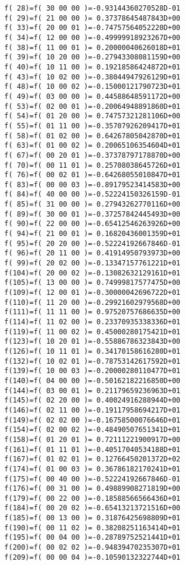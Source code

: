 {\begin{verbatim}
  f( 28)=f( 30 00 00 )=-0.93144360270528D-01
  f( 29)=f( 21 00 00 )= 0.37378645487843D+00
  f( 33)=f( 20 00 01 )=-0.74757564052220D+00
  f( 34)=f( 12 00 00 )=-0.49999918923267D+00
  f( 38)=f( 11 00 01 )= 0.20000040626018D+01
  f( 39)=f( 10 20 00 )=-0.27943308081159D+00
  f( 40)=f( 10 11 00 )= 0.19218586424872D+01
  f( 43)=f( 10 02 00 )=-0.38044947926129D+01
  f( 48)=f( 10 00 02 )=-0.15000121790723D+01
  f( 49)=f( 03 00 00 )= 0.44588648591172D+00
  f( 53)=f( 02 00 01 )=-0.20064948891860D+01
  f( 54)=f( 01 20 00 )= 0.74757321281106D+00
  f( 55)=f( 01 11 00 )=-0.35707926209417D+01
  f( 58)=f( 01 02 00 )= 0.64267805042870D+01
  f( 63)=f( 01 00 02 )= 0.20065106354604D+01
  f( 67)=f( 00 20 01 )=-0.37378797178870D+00
  f( 70)=f( 00 11 01 )= 0.25708038645726D+01
  f( 76)=f( 00 02 01 )=-0.64268055010847D+01
  f( 83)=f( 00 00 03 )=-0.89179523414583D+00
  f( 84)=f( 40 00 00 )=-0.52224150326159D-01
  f( 85)=f( 31 00 00 )= 0.27943262770116D+00
  f( 89)=f( 30 00 01 )=-0.37257842445493D+00
  f( 90)=f( 22 00 00 )=-0.65412546263926D+00
  f( 94)=f( 21 00 01 )= 0.16820436001359D+01
  f( 95)=f( 20 20 00 )=-0.52224192667846D-01
  f( 96)=f( 20 11 00 )= 0.41914950793973D+00
  f( 99)=f( 20 02 00 )=-0.13347157761221D+01
  f(104)=f( 20 00 02 )=-0.13082632129161D+01
  f(105)=f( 13 00 00 )= 0.74999817577475D+00
  f(109)=f( 12 00 01 )=-0.30000042696722D+01
  f(110)=f( 11 20 00 )=-0.29921602979568D+00
  f(111)=f( 11 11 00 )= 0.97520757686635D+00
  f(114)=f( 11 02 00 )= 0.23370935338336D+01
  f(119)=f( 11 00 02 )= 0.45000280175421D+01
  f(123)=f( 10 20 01 )=-0.55886786323843D+00
  f(126)=f( 10 11 01 )= 0.34170158616280D+01
  f(132)=f( 10 02 01 )=-0.78753142617592D+01
  f(139)=f( 10 00 03 )=-0.20000280110477D+01
  f(140)=f( 04 00 00 )=-0.50162182216850D+00
  f(144)=f( 03 00 01 )= 0.21179659236963D+01
  f(145)=f( 02 20 00 )= 0.40024916288944D+00
  f(146)=f( 02 11 00 )=-0.19117958694217D+01
  f(149)=f( 02 02 00 )=-0.16758500076646D+01
  f(154)=f( 02 00 02 )=-0.48490507651341D+01
  f(158)=f( 01 20 01 )= 0.72111221900917D+00
  f(161)=f( 01 11 01 )=-0.40517040534188D+01
  f(167)=f( 01 02 01 )= 0.12766450201372D+02
  f(174)=f( 01 00 03 )= 0.36786182170241D+01
  f(175)=f( 00 40 00 )=-0.52224192667846D-01
  f(176)=f( 00 31 00 )= 0.49889908271819D+00
  f(179)=f( 00 22 00 )=-0.18588566566436D+01
  f(184)=f( 00 20 02 )=-0.65413213721516D+00
  f(185)=f( 00 13 00 )= 0.31876425698809D+01
  f(190)=f( 00 11 02 )= 0.38208251163414D+01
  f(195)=f( 00 04 00 )=-0.28789752521441D+01
  f(200)=f( 00 02 02 )=-0.94839470235307D+01
  f(209)=f( 00 00 04 )=-0.10590132322744D+01


\end{verbatim}}
